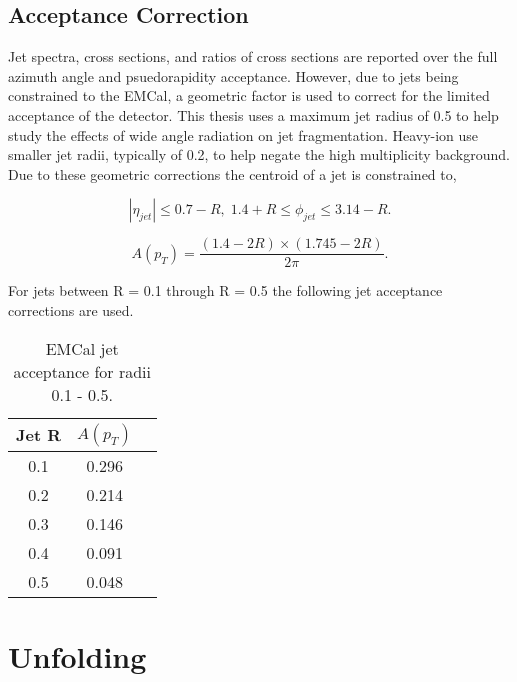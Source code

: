 \subsection{Acceptance Correction}
Jet spectra, cross sections, and ratios of cross sections are reported over the full azimuth angle and psuedorapidity acceptance.  However, due to jets being constrained to the EMCal, a geometric factor is used to correct for the limited acceptance of the detector.  This thesis uses a maximum jet radius of 0.5 to help study the effects of wide angle radiation on jet fragmentation.  Heavy-ion use smaller jet radii, typically of 0.2, to help negate the high multiplicity background.  Due to these geometric corrections the centroid of a jet is constrained to,

\begin{equation}
|\eta_{jet}| \leq 0.7 - R, \; 1.4 + R \leq \phi_{jet} \leq 3.14 -R.
\label{eq:jetconstration}
\end{equation}

\begin{equation}
A(p_{T}) = \frac{(1.4 - 2R) \times (1.745 - 2R)}{2 \pi}.
\label{eq:acceptance}
\end{equation}

For jets between R = 0.1 through R = 0.5 the following jet acceptance corrections are used.

\begin{table}[hb]
\label{tab:AcceptanceFactor}
\begin{center}
\begin{tabular}[b]{|c|c|c|}
	\hline
	Jet R & $A(p_{T})$ \\ \hline
	0.1 & 0.296 \\ \hline
	0.2 & 0.214\\ \hline
	0.3 & 0.146\\ \hline
	0.4 & 0.091\\ \hline
	0.5 & 0.048\\ \hline
\end{tabular}
\end{center}
\caption{EMCal jet acceptance for radii 0.1 - 0.5.}
\end{table}








\section{Unfolding}

